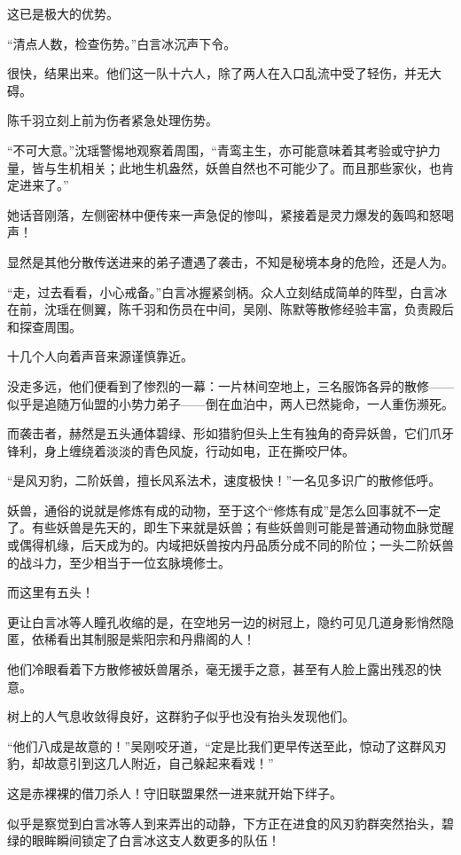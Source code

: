 这已是极大的优势。

“清点人数，检查伤势。”白言冰沉声下令。

很快，结果出来。他们这一队十六人，除了两人在入口乱流中受了轻伤，并无大碍。

陈千羽立刻上前为伤者紧急处理伤势。

“不可大意。”沈瑶警惕地观察着周围，“青鸾主生，亦可能意味着其考验或守护力量，皆与生机相关；此地生机盎然，妖兽自然也不可能少了。而且那些家伙，也肯定进来了。”

她话音刚落，左侧密林中便传来一声急促的惨叫，紧接着是灵力爆发的轰鸣和怒喝声！

显然是其他分散传送进来的弟子遭遇了袭击，不知是秘境本身的危险，还是人为。

“走，过去看看，小心戒备。”白言冰握紧剑柄。众人立刻结成简单的阵型，白言冰在前，沈瑶在侧翼，陈千羽和伤员在中间，吴刚、陈默等散修经验丰富，负责殿后和探查周围。

十几个人向着声音来源谨慎靠近。

没走多远，他们便看到了惨烈的一幕：一片林间空地上，三名服饰各异的散修——似乎是追随万仙盟的小势力弟子——倒在血泊中，两人已然毙命，一人重伤濒死。

而袭击者，赫然是五头通体碧绿、形如猎豹但头上生有独角的奇异妖兽，它们爪牙锋利，身上缠绕着淡淡的青色风旋，行动如电，正在撕咬尸体。

“是风刃豹，二阶妖兽，擅长风系法术，速度极快！”一名见多识广的散修低呼。

妖兽，通俗的说就是修炼有成的动物，至于这个“修炼有成”是怎么回事就不一定了。有些妖兽是先天的，即生下来就是妖兽；有些妖兽则可能是普通动物血脉觉醒或偶得机缘，后天成为的。内域把妖兽按内丹品质分成不同的阶位；一头二阶妖兽的战斗力，至少相当于一位玄脉境修士。

而这里有五头！

更让白言冰等人瞳孔收缩的是，在空地另一边的树冠上，隐约可见几道身影悄然隐匿，依稀看出其制服是紫阳宗和丹鼎阁的人！

他们冷眼看着下方散修被妖兽屠杀，毫无援手之意，甚至有人脸上露出残忍的快意。

树上的人气息收敛得良好，这群豹子似乎也没有抬头发现他们。

“他们八成是故意的！”吴刚咬牙道，“定是比我们更早传送至此，惊动了这群风刃豹，却故意引到这几人附近，自己躲起来看戏！”

这是赤裸裸的借刀杀人！守旧联盟果然一进来就开始下绊子。

似乎是察觉到白言冰等人到来弄出的动静，下方正在进食的风刃豹群突然抬头，碧绿的眼眸瞬间锁定了白言冰这支人数更多的队伍！

